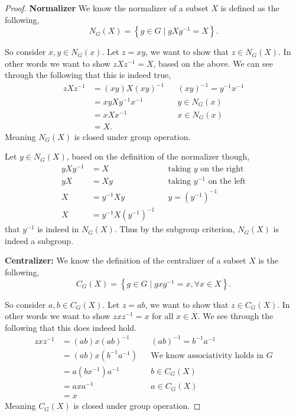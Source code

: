 \documentclass[10pt]{article}
\newcommand{\set}[1]{\left\{#1\right\}} %
\begin{document}
\begin{proof}
    \textbf{Normalizer} We know the normalizer of a subset $X$ is defined as the following, \[N_G(X) = \set{g \in G \mid gXg^{-1} = X}.\]

    So consider $x,y \in N_G(x)$. Let $z = xy$, we want to show that $z \in N_G(X)$. In other words we want to show $zXz^{-1} = X$, based on the above. We can see through the following that this is indeed true,
    \begin{align*}
        zXz^{-1} &= (xy)X(xy)^{-1} && (xy)^{-1} = y^{-1}x^{-1} \\
        &= xyXy^{-1}x^{-1} && y \in N_G(x) \\
        &= xXx^{-1} && x \in N_G(x) \\
        &= X.
    \end{align*}
    Meaning $N_G(X)$ is closed under group operation. 

    Let $y\in N_G(X)$, based on the definition of the normalizer though,
    \begin{align*}
        yXy^{-1} &= X && \text{taking $y$ on the right} \\
        yX &= Xy && \text{taking $y^{-1}$ on the left} \\
        X &= y^{-1}Xy &&y = (y^{-1})^{-1} \\
        X &= y^{-1}X(y^{-1})^{-1}
    \end{align*}
    that $y^{-1}$ is indeed in $N_G(X).$
    Thus by the subgroup criterion, $N_G(X)$ is indeed a subgroup. 
    
    \textbf{Centralizer:} We know the definition of the centralizer of a subset $X$ is the following, \[C_G(X) = \set{g\in G \mid gxg^{-1} = x, \forall x \in X}.\]

    So consider $a,b \in C_G(X)$. Let $z = ab$, we want to show that $z \in C_G(X)$. In other words we want to show $zxz^{-1} = x$ for all $x\in X$. We see through the following that this does indeed hold.
    \begin{align*}
        zxz^{-1} &= (ab)x(ab)^{-1} && (ab)^{-1} = b^{-1}a^{-1} \\
        &= (ab)x(b^{-1}a^{-1}) && \text{We know associativity holds in $G$} \\
        &= a(bx^{-1})a^{-1}  && b \in C_G(X) \\
        & = axa^{-1} && a \in C_G(X) \\
        &= x
    \end{align*}
    Meaning $C_G(X)$ is closed under group operation. 


\end{proof}
\end{document}
